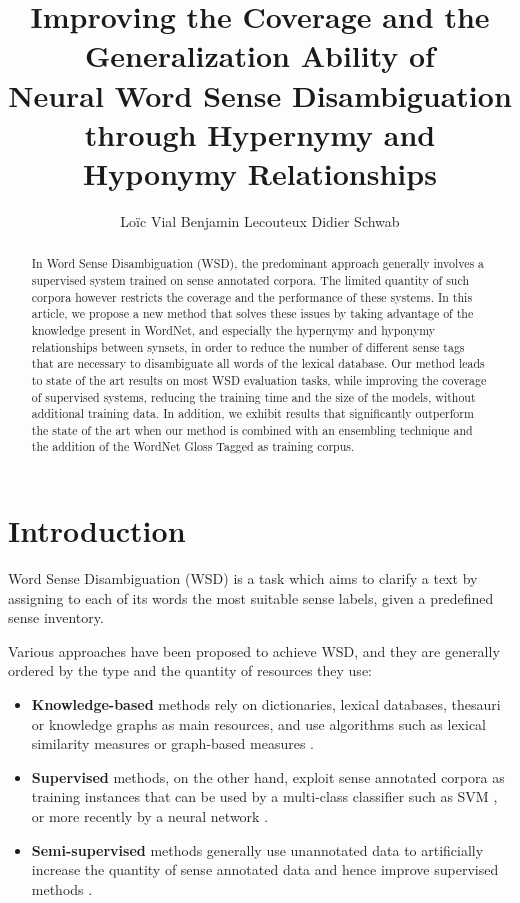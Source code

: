 \documentclass[11pt,a4paper]{article}
\title{Improving the Coverage and the Generalization Ability of \\ Neural Word Sense Disambiguation through Hypernymy and Hyponymy Relationships}
\author{Loïc Vial \quad Benjamin Lecouteux \quad Didier Schwab}
\date{}
\newcommand{\tbf}[1]{\textbf{#1}}
\begin{document}
\maketitle

\begin{abstract}
In Word Sense Disambiguation (WSD), the predominant approach generally involves a supervised system trained on sense annotated corpora. The limited quantity of such corpora however restricts the coverage and the performance of these systems. In this article, we propose a new method that solves these issues by taking advantage of the knowledge present in WordNet, and especially the hypernymy and hyponymy relationships between synsets, in order to reduce the number of different sense tags that are necessary to disambiguate all words of the lexical database. Our method leads to state of the art results on most WSD evaluation tasks, while improving the coverage of supervised systems, reducing the training time and the size of the models, without additional training data. In addition, we exhibit results that significantly outperform the state of the art when our method is combined with an ensembling technique and the addition of the WordNet Gloss Tagged as training corpus.
\end{abstract}

\section{Introduction}

Word Sense Disambiguation (WSD) is a task which aims to clarify a text by assigning to each of its words the most suitable sense labels, given a predefined sense inventory.

Various approaches have been proposed to achieve WSD, and they are generally ordered by the type and the quantity of resources they use:
\begin{itemize}
    \item \tbf{Knowledge-based} methods rely on dictionaries, lexical databases, thesauri or knowledge graphs as main resources, and use algorithms such as lexical similarity measures \citep{Lesk1986} or graph-based measures \citep{Moro2014EntityLM}.
    \item \tbf{Supervised} methods, on the other hand, exploit sense annotated corpora as training instances that can be used by a multi-class classifier such as SVM \citep{Chan2007,Zhong2010}, or more recently by a neural network \citep{kaageback2016word}.
    \item \tbf{Semi-supervised} methods generally use unannotated data to artificially increase the quantity of sense annotated data and hence improve supervised methods \citep{yuan_2016}.
\end{itemize}
\end{document}
